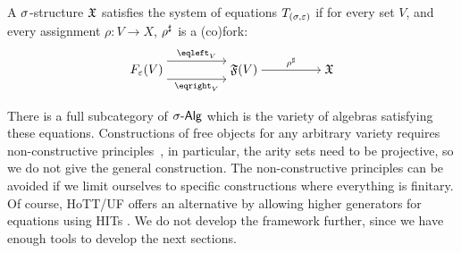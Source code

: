 \begin{definition}
    A $\sigma$-structure $\mathfrak{X}$ satisfies the system of equations $T_{(\sigma,\varepsilon)}$ if for every set $V$,
    and every assignment $\rho : V \to X$, ${\rho}^{\sharp}$ is a (co)fork:
    \[\begin{tikzcd}[ampersand replacement=\&,cramped]
            {\EqSig(V)} \&\& {\str{F}(V)} \&\& {\str{X}}
            \arrow["{\ext{\rho}}", from=1-3, to=1-5]
            \arrow["{\eqleft_{V}}", shift left=3, from=1-1, to=1-3]
            \arrow["{\eqright_{V}}"', shift right=3, from=1-1, to=1-3]
        \end{tikzcd}\]
\end{definition}

There is a full subcategory of $\sigAlg$ which is the variety of algebras satisfying these equations.
%
Constructions of free objects for any arbitrary variety requires non-constructive
principles~\cite[Section 7, pg 142]{blassWordsFreeAlgebras1983},
in particular, the arity sets need to be projective, so we do not give the general construction.
%
The non-constructive principles can be avoided if we limit ourselves to specific constructions
where everything is finitary.
%
Of course, HoTT/UF offers an alternative by allowing higher generators for equations using HITs
\cite{univalentfoundationsprogramHomotopyTypeTheory2013}.
%
We do not develop the framework further, since we have enough tools to develop the next sections.
